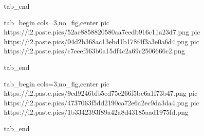   tab_end
\fi

\ifcmt
  tab_begin cols=3,no_fig,center
	pic https://i2.paste.pics/52ae8858820580aa7eedb916c11a23d7.png
	pic https://i2.paste.pics/04d2b368ac13ebd1b178f4f3a3e0a6d4.png
	pic https://i2.paste.pics/c7eeef563b0a15df4c2a69c2506666c2.png

  tab_end
\fi

\ifcmt
  tab_begin cols=3,no_fig,center
	pic https://i2.paste.pics/9cd9246bfb5ed75e266f5be6a1f73b47.png
	pic https://i2.paste.pics/4737063f5dd2190ca72e6a2ec9da3da4.png
	pic https://i2.paste.pics/1b3342393f89a42a8d43185aad1975fd.png

  tab_end
\fi
